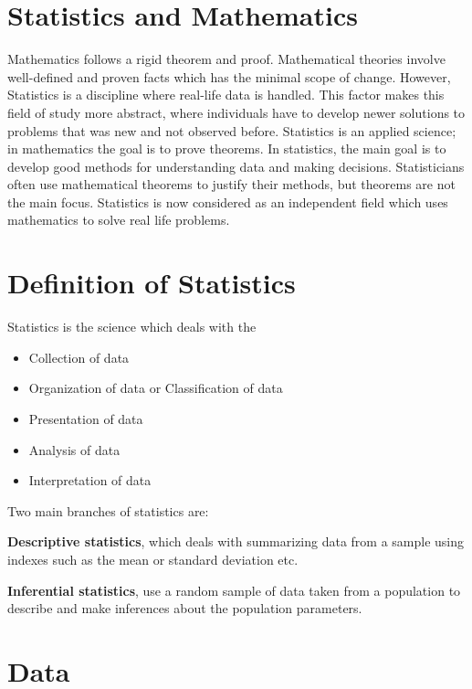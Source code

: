 \documentclass[
]{book}
\begin{document}
\section{Statistics and Mathematics}\label{statistics-and-mathematics}

Mathematics follows a rigid theorem and proof. Mathematical theories
involve well-defined and proven facts which has the minimal scope of
change. However, Statistics is a discipline where real-life data is
handled. This factor makes this field of study more abstract, where
individuals have to develop newer solutions to problems that was new and
not observed before. Statistics is an applied science; in mathematics
the goal is to prove theorems. In statistics, the main goal is to
develop good methods for understanding data and making decisions.
Statisticians often use mathematical theorems to justify their methods,
but theorems are not the main focus. Statistics is now considered as an
independent field which uses mathematics to solve real life problems.

\section{Definition of Statistics}\label{definition-of-statistics}

Statistics is the science which deals with the

\begin{itemize}
\item
  Collection of data
\item
  Organization of data or Classification of data
\item
  Presentation of data
\item
  Analysis of data
\item
  Interpretation of data
\end{itemize}

Two main branches of statistics are:

\textbf{Descriptive statistics}, which deals with summarizing data from a
sample using indexes such as the mean or standard deviation etc.

\textbf{Inferential statistics}, use a random sample of data taken from a
population to describe and make inferences about the population
parameters.

\section{Data}\label{data}
\end{document}
